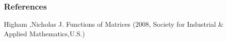 



\begin{frame}
\frametitle{References}

\begin{thebibliography}{99}
Higham ,Nicholas J. 
Functions of Matrices (2008, Society for Industrial \& Applied Mathematics,U.S.)
\end{thebibliography}

\end{frame}

